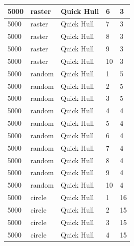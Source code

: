 \documentclass[12pt]{article}
\begin{document}
\begin{longtable}{|l|l|l|l|l|}
5000         & raster            & Quick Hull & 6          & 3                             \\ \hline
5000         & raster            & Quick Hull & 7          & 3                             \\ \hline
5000         & raster            & Quick Hull & 8          & 3                             \\ \hline
5000         & raster            & Quick Hull & 9          & 3                             \\ \hline
5000         & raster            & Quick Hull & 10         & 3                             \\ \hline
5000         & random            & Quick Hull & 1          & 5                             \\ \hline
5000         & random            & Quick Hull & 2          & 5                             \\ \hline
5000         & random            & Quick Hull & 3          & 5                             \\ \hline
5000         & random            & Quick Hull & 4          & 4                             \\ \hline
5000         & random            & Quick Hull & 5          & 4                             \\ \hline
5000         & random            & Quick Hull & 6          & 4                             \\ \hline
5000         & random            & Quick Hull & 7          & 4                             \\ \hline
5000         & random            & Quick Hull & 8          & 4                             \\ \hline
5000         & random            & Quick Hull & 9          & 4                             \\ \hline
5000         & random            & Quick Hull & 10         & 4                             \\ \hline
5000         & circle            & Quick Hull & 1          & 16                            \\ \hline
5000         & circle            & Quick Hull & 2          & 15                            \\ \hline
5000         & circle            & Quick Hull & 3          & 15                            \\ \hline
5000         & circle            & Quick Hull & 4          & 15                            \\ \hline

\end{longtable}
\end{document}
